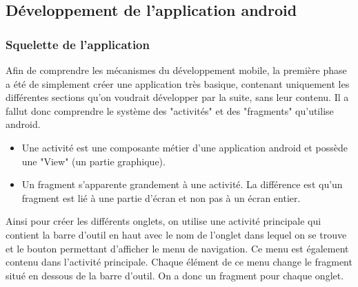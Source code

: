 \subsection{Développement de l'application android}
\subsubsection{Squelette de l'application}
Afin de comprendre les mécanismes du développement mobile, la première phase a été de simplement créer une application très basique, contenant
uniquement les différentes sections qu'on voudrait développer par la suite, sans leur contenu. Il a fallut donc comprendre le système des 
"activités" et des "fragments" qu'utilise android.
\begin{itemize}
  \item Une activité est une composante métier d'une application android et possède une "View" (un partie graphique).
  \item Un fragment s'apparente grandement à une activité. La différence est qu'un fragment est lié à une partie d'écran et non pas à un écran entier. 
\end{itemize}
Ainsi pour créer les différents onglets, on utilise une activité principale qui contient la barre d'outil en haut avec le nom de l'onglet
dans lequel on se trouve et le bouton permettant d'afficher le menu de navigation. Ce menu est également contenu dans l'activité principale.
Chaque élément de ce menu change le fragment situé en dessous de la barre d'outil. On a donc un fragment pour chaque onglet. 
